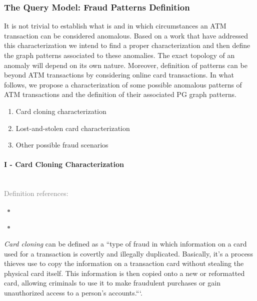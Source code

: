 \subsubsection*{The Query Model: Fraud Patterns Definition}

It is not trivial to establish what is and in which circumstances an ATM transaction can be considered anomalous. Based on a work that have addressed this characterization \cite{FP-magdalena2021artificial} we intend to find a proper characterization and then define the graph patterns associated to these anomalies. The exact topology of an anomaly will depend on its own nature. Moreover, definition of patterns can be beyond ATM transactions by considering online card transactions. In what follows, we propose a characterization of some possible anomalous patterns of ATM transactions and the definition of their associated PG graph patterns. 

\begin{enumerate}
\renewcommand{\labelenumi}{\Roman{enumi}.} %
    \item Card cloning characterization
    \item Lost-and-stolen card characterization
    \item Other possible fraud scenarios
\end{enumerate}


\paragraph{I - Card Cloning Characterization\\\\}

\textcolor{gray}{Definition references:
\begin{itemize}
    \item \cite{FP-unit21_card_cloning}
    \item 
\end{itemize}
}

\emph{Card cloning} can be defined as a ``type of fraud in which information on a card used for a transaction is covertly and illegally duplicated. Basically, it’s a process thieves use to copy the information on a transaction card without stealing the physical card itself. This information is then copied onto a new or reformatted card, allowing criminals to use it to make fraudulent purchases or gain unauthorized access to a person’s accounts.```\cite{FP-unit21_card_cloning}.

